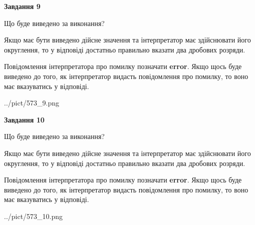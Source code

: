 \documentclass[12pt, ukrainian]{article}
\begin{document}
{\begin {Large}
{\begin {center}\textbf{Завдання 9}\end {center}}\par
Що буде виведено за виконання? \par

Якщо має бути виведено дійсне значення та інтерпретатор має здійснювати його округлення, 
то у відповіді достатньо правильно вказати два дробових розряди.

Повідомлення інтерпретатора про помилку позначати \textbf{error}.
Якщо щось буде виведено до того, як інтерпретатор видасть повідомлення про помилку, 
то воно має вказуватись у відповіді. \par

\begin{center}
	{../pict/573_9.png}
\end{center}
\newpage

{\begin {center}\textbf{Завдання 10}\end {center}}\par
Що буде виведено за виконання? \par

Якщо має бути виведено дійсне значення та інтерпретатор має здійснювати його округлення, 
то у відповіді достатньо правильно вказати два дробових розряди.

Повідомлення інтерпретатора про помилку позначати \textbf{error}.
Якщо щось буде виведено до того, як інтерпретатор видасть повідомлення про помилку, 
то воно має вказуватись у відповіді. \par

\begin{center}
	{../pict/573_10.png}
\end{center}
\newpage

\end {Large}}
\end{document}
